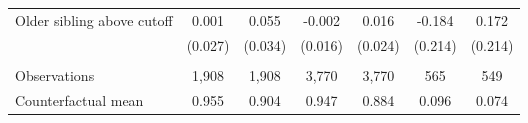 {{\begin{tabular}{lcccccc}
Older sibling above cutoff&       0.001   &       0.055   &      -0.002   &       0.016   &      -0.184   &       0.172   \\
                    &     (0.027)   &     (0.034)   &     (0.016)   &     (0.024)   &     (0.214)   &     (0.214)   \\
                    &               &               &               &               &               &               \\
Observations        &       1,908   &       1,908   &       3,770   &       3,770   &         565   &         549   \\
Counterfactual mean &       0.955   &       0.904   &       0.947   &       0.884   &       0.096   &       0.074   \\
 

\bottomrule
\end{tabular}
}
}
